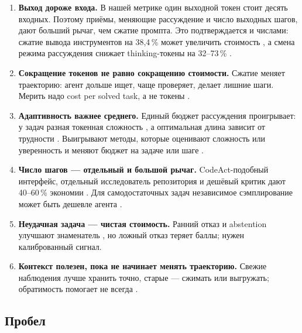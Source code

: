 \documentclass[11pt,a4paper]{article}
\begin{document}
\begin{enumerate}
  \item \textbf{Выход дороже входа.} В нашей метрике один выходной токен
        стоит десять входных. Поэтому приёмы, меняющие рассуждение и число
        выходных шагов, дают больший рычаг, чем сжатие промпта. Это
        подтверждается и числами: сжатие вывода инструментов на 38{,}4\,\%
        может увеличить стоимость \cite{weinberger2026tokenreduction}, а
        смена режима рассуждения снижает thinking-токены на 32--73\,\%
        \cite{lee2026dartdraft}.
  \item \textbf{Сокращение токенов не равно сокращению стоимости.} Сжатие
        меняет траекторию: агент дольше ищет, чаще проверяет, делает лишние
        шаги. Мерить надо cost per solved task, а не токены
        \cite{weinberger2026tokenreduction,bai2026aiagents}.
  \item \textbf{Адаптивность важнее среднего.} Единый бюджет рассуждения
        проигрывает: у задач разная токенная сложность
        \cite{lee2025wellllms}, а оптимальная длина зависит от трудности
        \cite{zhou2026thinkinghurts}. Выигрывают методы, которые оценивают
        сложность или уверенность и меняют бюджет на задаче или шаге
        \cite{han2024tokenbudget,yang2025dynamicearly,yang2026aresadaptive,lee2026dartdraft}.
  \item \textbf{Число шагов — отдельный и большой рычаг.} CodeAct-подобный
        интерфейс, отдельный исследователь репозитория и дешёвый критик
        дают 40--60\,\% экономии \cite{xu2026devilinterface,zhang2026fastcontexttrainin,gandhi2026steerdon}.
        Для самодостаточных задач независимое сэмплирование может быть
        дешевле агента \cite{dong2026independentsamplin}.
  \item \textbf{Неудачная задача — чистая стоимость.} Ранний отказ и
        abstention улучшают знаменатель \cite{zellinger2025costsaving,luo2026heraharness},
        но ложный отказ теряет баллы; нужен калиброванный сигнал.
  \item \textbf{Контекст полезен, пока не начинает менять траекторию.}
        Свежие наблюдения лучше хранить точно, старые — сжимать или
        выгружать; обратимость помогает не всегда
        \cite{fan2026empiricalstudy,chen2026measurebefore}.
\end{enumerate}

\subsection{Пробел}
\end{document}
